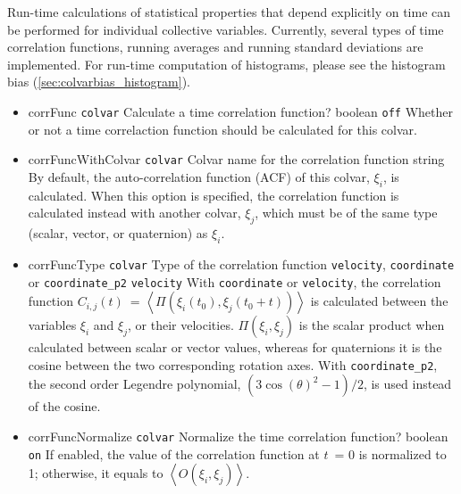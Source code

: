 
Run-time calculations of statistical properties that depend explicitly on time can be performed for individual collective variables.
Currently, several types of time correlation functions, running averages and running standard deviations are implemented.
For run-time computation of histograms, please see the histogram bias (\ref{sec:colvarbias_histogram}).

\begin{itemize}

\item %
  \keydef
    {corrFunc}{%
    \texttt{colvar}}{%
    Calculate a time correlation function?}{%
    boolean}{%
    \texttt{off}}{%
    Whether or not a time correlaction function should be calculated
    for this colvar.}

\item %
  \key
    {corrFuncWithColvar}{%
    \texttt{colvar}}{%
    Colvar name for the correlation function}{%
    string}{%
    By default, the auto-correlation function (ACF) of this colvar,
    $\xi_{i}$, is calculated.  When this option is specified, the
    correlation function is calculated instead with another colvar,
    $\xi_{j}$, which must be of the same type (scalar, vector, or
    quaternion) as $\xi_{i}$.}

\item%
  \keydef
    {corrFuncType}{%
    \texttt{colvar}}{%
    Type of the correlation function}{%
    \texttt{velocity}, \texttt{coordinate} or
    \texttt{coordinate\_p2}}{%
    \texttt{velocity}}{%
    With \texttt{coordinate} or \texttt{velocity}, the correlation
    function $C_{i,j}(t)$~= $\left\langle \Pi\left(\xi_{i}(t_{0}),
        \xi_{j}(t_{0}+t)\right) \right\rangle$ is calculated between
    the variables $\xi_{i}$ and $\xi_{j}$, or their velocities.
    $\Pi(\xi_{i}, \xi_{j})$ is the scalar product when calculated
    between scalar or vector values, whereas for quaternions it is the
    cosine between the two corresponding rotation axes.  With
    \texttt{coordinate\_p2}, the second order Legendre polynomial,
    $(3\cos(\theta)^{2}-1)/2$, is used instead of the cosine.}

\item %
  \keydef
    {corrFuncNormalize}{%
    \texttt{colvar}}{%
    Normalize the time correlation function?}{%
    boolean}{%
    \texttt{on}}{%
    If enabled, the value of the correlation function at $t$~= 0
    is normalized to 1; otherwise, it equals to $\left\langle
      O\left(\xi_{i}, \xi_{j}\right) \right\rangle$.}


\end{itemize}

